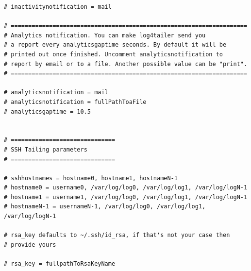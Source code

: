 \begin{verbatim}
# inactivitynotification = mail

# ====================================================================
# Analytics notification. You can make log4tailer send you 
# a report every analyticsgaptime seconds. By default it will be 
# printed out once finished. Uncomment analyticsnotification to 
# report by email or to a file. Another possible value can be "print".
# ====================================================================

# analyticsnotification = mail
# analyticsnotification = fullPathToaFile
# analyticsgaptime = 10.5


# ==============================
# SSH Tailing parameters
# ==============================

# sshhostnames = hostname0, hostname1, hostnameN-1
# hostname0 = username0, /var/log/log0, /var/log/log1, /var/log/logN-1
# hostname1 = username1, /var/log/log0, /var/log/log1, /var/log/logN-1
# hostnameN-1 = usernameN-1, /var/log/log0, /var/log/log1, /var/log/logN-1

# rsa_key defaults to ~/.ssh/id_rsa, if that's not your case then 
# provide yours

# rsa_key = fullpathToRsaKeyName 

\end{verbatim}

\newpage
